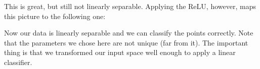 \documentclass[11pt,letterpaper]{article}
\begin{document}
\begin{solution}
\begin{sol}
\begin{center}
\end{center}

This is great, but still not linearly separable. Applying the ReLU, however, maps
this picture to the following one:

\begin{center}
\end{center}

Now our data is linearly separable and we can classify the points correctly. 
Note that the parameters we chose here are not unique (far from it). The 
important thing is that we transformed our input space well enough 
to apply a linear classifier.

\end{sol}
\end{solution}
\end{document}
